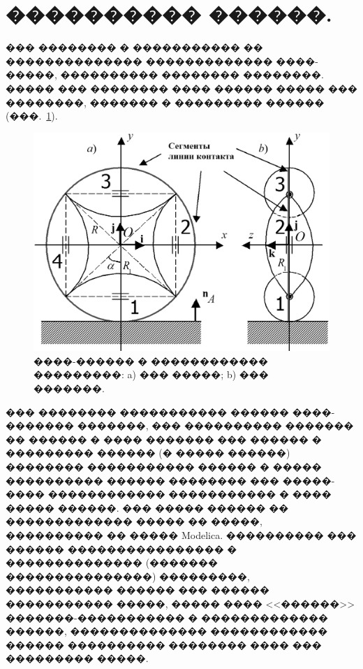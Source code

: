 \documentclass[12pt,a4paper]{article}
\begin{document}
\section{���������� ������.\ }
\label{sec2}
��� �������� � ����������� �� �������������� ������������� ����-�����, 
���������� �������� ��������. ����� ��� �������� ���� ������ ����� ��� 
��������, ������� � ��������� ������ (���.~\ref{OmniWheel}).
\begin{figure}[htb]
\centering\includegraphics[width=13cm]{OmniWheel.eps}
\caption{����-������ � ������������ ���������: a) ��� �����; b) ��� �������.}
\label{OmniWheel}
\end{figure}

��� �������� ����������� ������ ����-������� �������, ��� ���������� ������� ��
������ � ���� ������� ��� ������ � ��������� ������ (� ����� ������) �������� 
����������� ������ � ����� ���������� ������ �������� ��� �����-���� 
������������ ����������� � ���� ����� ������. ��� ����� ������ �� �������������
����� �� �����, ���������� �� ����� Modelica. ���������� ��� ������ 
���������������� � �������������� (������� ���������������) ���������, 
����������� ������ ��� ������ ����������� �����, ����� ���� <<������>> 
�������-����������� � ������������� ������, �������������� ������������ ������
���������� �������� ���� ��� ��������� �����.
\end{document}
